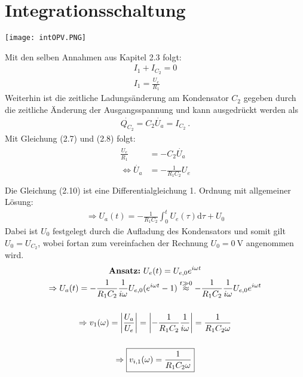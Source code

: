 \section{Integrationsschaltung}
\label{sec:intschaltung}
\begin{center}
    \texttt{[image: intOPV.PNG]} %
\end{center}
Mit den selben Annahmen aus Kapitel 2.3 folgt:
\begin{gather}
    I_1 + I_{C_2} = 0\\
    I_1 = \frac{U_e}{R_1}
\end{gather}
Weiterhin ist die zeitliche Ladungsänderung am Kondensator $C_2$ gegeben durch die zeitliche Änderung der Ausgangsspannung und kann ausgedrückt werden als
\begin{gather}
    \dot{Q_{C_2}} = C_2 \dot{U_a} = I_{C_2}~.
\end{gather}
Mit Gleichung (2.7) und (2.8) folgt:
\begin{gather}
    \begin{aligned}
        \frac{U_e}{R_1} &= -C_2 \dot{U_a}\\
        \Leftrightarrow \dot{U_a} &= -\frac{1}{R_1 C_2} U_e\\[0.5cm]
    \end{aligned}
\end{gather}
Die Gleichung (2.10) ist eine Differentialgleichung 1. Ordnung mit allgemeiner Lösung:
\begin{gather}
    \Rightarrow \boxed{U_a(t) = -\frac{1}{R_1 C_2} \int_0^t U_e(\tau)\text{d}\tau + U_0}
\end{gather}
Dabei ist $U_0$ festgelegt durch die Aufladung des Kondensators und somit gilt $U_0 = U_{C_2}$, wobei fortan zum vereinfachen der Rechnung $U_0=0~\text{V}$ angenommen wird.\\
\begin{gather}
    \text{\textbf{Ansatz:}}~U_e(t) = U_{e,0}e^{i\omega t}\\
    \Rightarrow U_a(t) = -\frac{1}{R_1 C_2} \frac{1}{i\omega} U_{e,0}(e^{i\omega t}-1) \overset{t \gg 0}{\approx} -\frac{1}{R_1 C_2} \frac{1}{i\omega} U_{e,0}e^{i\omega t}\\[0.5cm]
    \Rightarrow v_{1}(\omega) = \abs{\frac{U_a}{U_e}} = \abs{-\frac{1}{R_1 C_2} \frac{1}{i\omega}} = \frac{1}{R_1 C_2 \omega}\\[0.5cm]
    \Rightarrow \boxed{v_{i,1}(\omega)=\frac{1}{R_1 C_2 \omega}}
\end{gather}
